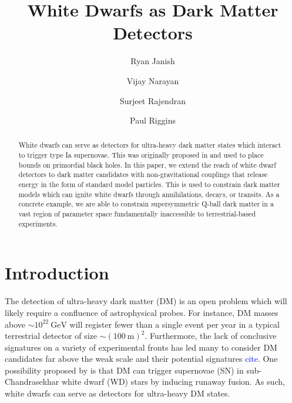 \documentclass[twocolumn,showpacs,preprintnumbers,amsmath,amssymb,prd]{revtex4}
\newcommand{\GeV}{\text{GeV}}
\begin{document}
\title{White Dwarfs as Dark Matter Detectors}

\author{Ryan Janish}

\author{Vijay Narayan}

\author{Surjeet Rajendran}

\author{Paul Riggins}

\begin{abstract}

White dwarfs can serve as detectors for ultra-heavy dark matter states which interact to trigger type Ia supernovae.
This was originally proposed in \cite{Graham:2015apa} and used to place bounds on primordial black holes.
In this paper, we extend the reach of white dwarf detectors to dark matter candidates with non-gravitational couplings that release energy in the form of standard model particles.
This is used to constrain dark matter models which can ignite white dwarfs through annihilations, decays, or transits.
As a concrete example, we are able to constrain supersymmetric Q-ball dark matter in a vast region of parameter space fundamentally inaccessible to terrestrial-based experiments.


\end{abstract}
\maketitle
\tableofcontents
\newpage

\section{Introduction}
\label{sec:Introduction}

The detection of ultra-heavy dark matter (DM) is an open problem which will likely require a confluence of astrophysical probes.
For instance, DM masses above $\sim 10^{22} ~\GeV$ will register fewer than a single event per year in a typical terrestrial detector of size $\sim (100 ~\text{m})^2$.
Furthermore, the lack of conclusive signatures on a variety of experimental fronts has led many to consider DM candidates far above the weak scale and their potential signatures \textcolor{blue}{cite}.
One possibility proposed by \cite{Graham:2015apa} is that DM can trigger supernovae (SN) in sub-Chandrasekhar white dwarf (WD) stars by inducing runaway fusion.
As such, white dwarfs can serve as detectors for ultra-heavy DM states.
\end{document}
